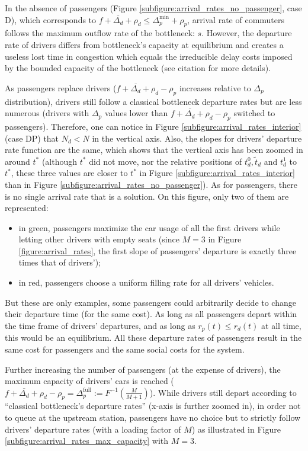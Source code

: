 \documentclass[english, a4paper]{article}
\theoremstyle{plain}
\theoremstyle{definition}
\theoremstyle{remark}
\begin{document}
In the absence of passengers (Figure \ref{subfigure:arrival_rates_no_passenger}, case D), which corresponds to $f + \overline{\Delta_d} + \rho_d \leq \Delta_p^{\text{min}} + \rho_p$, arrival rate of commuters follows the maximum outflow rate of the bottleneck: $s$. However, the departure rate of drivers differs from bottleneck’s capacity at equilibrium and creates a useless lost time in congestion which equals the irreducible delay costs imposed by the bounded capacity of the bottleneck (see \alert{citation} for more details).

As passengers replace drivers ($f + \overline{\Delta_d} + \rho_d - \rho_p$ increases relative to $\Delta_p$ distribution), drivers still follow a classical bottleneck departure rates but are less numerous (drivers with $\Delta_p$ values lower than $f + \overline{\Delta_d} + \rho_d - \rho_p$ switched to passengers). Therefore, one can notice in Figure \ref{subfigure:arrival_rates_interior} (case DP) that $N_d < N$ in the vertical axis. Also, the slopes for drivers’ departure rate function are the same, which shows that the vertical axis has been zoomed in around $t^*$ (although $t^*$ did not move, nor the relative positions of $t_d^0, \tilde{t}_d$ and $t_d^1$ to $t^*$, these three values are closer to $t^*$ in Figure \ref{subfigure:arrival_rates_interior} than in Figure \ref{subfigure:arrival_rates_no_passenger}). As for passengers, there is no single arrival rate that is a solution. On this figure, only two of them are represented:\begin{itemize}
    \item in green, passengers maximize the car usage of all the first drivers while letting other drivers with empty seats (since $M = 3$ in Figure \ref{figure:arrival_rates}, the first slope of passengers’ departure is exactly three times that of drivers’);
    \item in red, passengers choose a uniform filling rate for all drivers’ vehicles.
\end{itemize}
But these are only examples, some passengers could arbitrarily decide to change their departure time (for the same cost). As long as all passengers depart within the time frame of drivers’ departures, and as long as $r_p(t) \leq r_d(t)$ at all time, this would be an equilibrium. All these departure rates of passengers result in the same cost for passengers and the same social costs for the system.

Further increasing the number of passengers (at the expense of drivers),  the maximum capacity of drivers’ cars is reached ($f + \overline{\Delta_d} + \rho_d - \rho_p = \Delta_p^{\text{full}} := F^{-1}\left( \frac{M}{M + 1} \right)$). While drivers still depart according to ``classical bottleneck’s departure rates'' (x-axis is further zoomed in), in order not to queue at the upstream station, passengers have no choice but to strictly follow drivers’ departure rates (with a loading factor of $M$) as illustrated in Figure \ref{subfigure:arrival_rates_max_capacity} with $M = 3$.
\end{document}
